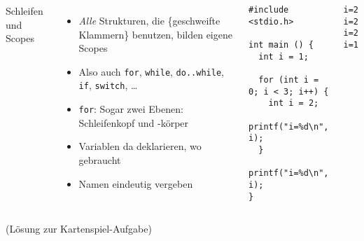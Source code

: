 \begin{frame}[fragile]
%
\begin{columns}[T]
\begin{Large}
{Schleifen und Scopes}
\vspace{6pt}
\end{Large}
%
\begin{itemize}
\item \emph{Alle} Strukturen, die \{geschweifte Klammern\} benutzen, bilden eigene Scopes
\item Also auch \texttt{for}, \texttt{while}, \texttt{do..while},
	  \texttt{if}, \texttt{switch}, \ldots
\item \texttt{for}: Sogar zwei Ebenen: Schleifenkopf und -körper
\item Variablen da deklarieren, wo gebraucht
\item Namen eindeutig vergeben
\end{itemize}
%
\begin{codebox}
\begin{verbatim}
#include <stdio.h>

int main () {
  int i = 1;
  
  for (int i = 0; i < 3; i++) {
    int i = 2;
    printf("i=%d\n", i);
  }
  printf("i=%d\n", i);
}
\end{verbatim}
\end{codebox}
%
\begin{cmdbox}[Ausgabe]
\begin{verbatim}
i=2
i=2
i=2
i=1
\end{verbatim}
\end{cmdbox}
%
\end{columns}
%
\end{frame}


\begin{frame}[fragile]
%
(Lösung zur Kartenspiel-Aufgabe)
%
\end{frame}

